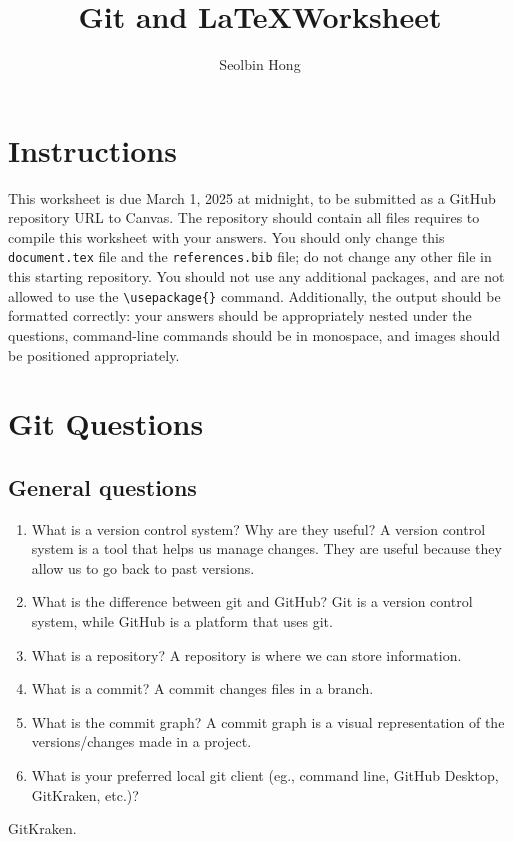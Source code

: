 \documentclass[10pt,twocolumn]{article}
\title{Git and \LaTeX Worksheet}
\author{Seolbin Hong}
\affiliation{Occidental College}
\begin{document}
\maketitle

\section{Instructions}

This worksheet is due March 1, 2025 at midnight, to be submitted as a GitHub repository URL to Canvas. The repository should contain all files requires to compile this worksheet with your answers. You should only change this \texttt{document.tex} file and the  \texttt{references.bib} file; do not change any other file in this starting repository. You should not use any additional packages, and are not allowed to use the \texttt{{\textbackslash}usepackage\{\}} command. Additionally, the output should be formatted correctly: your answers should be appropriately nested under the questions, command-line commands should be in monospace, and images should be positioned appropriately.

\section{Git Questions}

\subsection{General questions}

\begin{enumerate}
    \item What is a version control system? Why are they useful?
A version control system is a tool that helps us manage changes. They are useful because they allow us to go back to past versions.
    \item What is the difference between git and GitHub?
Git is a version control system, while GitHub is a platform that uses git.
    \item What is a repository?
A repository is where we can store information.
    \item What is a commit?
A commit changes files in a branch.
    \item What is the commit graph?
A commit graph is a visual representation of the versions/changes made in a project.
    \item What is your preferred local git client (eg., command line, GitHub Desktop, GitKraken, etc.)?
\end{enumerate}
GitKraken.
\end{document}
